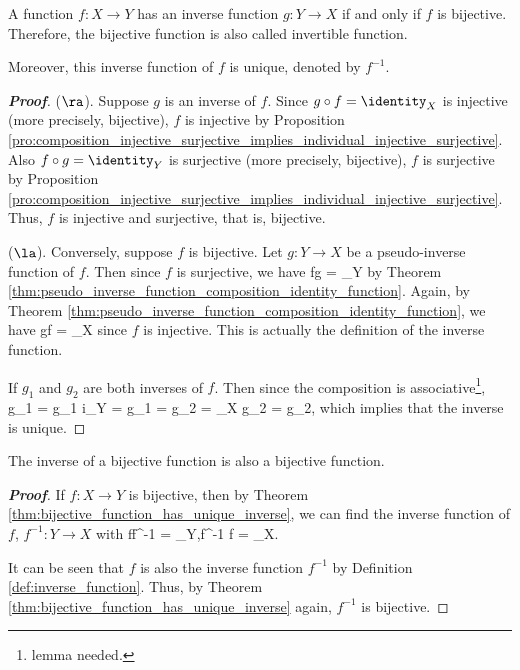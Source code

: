 \begin{theorem}\label{thm:bijective_function_has_unique_inverse}
A function $f:X\to Y$ has an inverse function $g:Y\to X$ if and only if $f$ is bijective. Therefore, the bijective function is also called invertible function.

Moreover, this inverse function of $f$ is unique, denoted by $f^{-1}$.
\end{theorem}

\begin{proof}[\bf Proof]
($\ra$). Suppose $g$ is an inverse of $f$. Since $g\circ f = \identity_X$ is injective (more precisely, bijective), $f$ is injective by Proposition \ref{pro:composition_injective_surjective_implies_individual_injective_surjective}. Also $f\circ g = \identity_Y$ is surjective (more precisely, bijective), $f$ is surjective by Proposition \ref{pro:composition_injective_surjective_implies_individual_injective_surjective}. Thus, $f$ is injective and surjective, that is, bijective.

($\la$). Conversely, suppose $f$ is bijective. Let $g:Y\to X$ be a pseudo-inverse function of $f$. Then since $f$ is surjective, we have
\be
f\circ g = \identity_Y
\ee
by Theorem \ref{thm:pseudo_inverse_function_composition_identity_function}. Again, by Theorem \ref{thm:pseudo_inverse_function_composition_identity_function}, we have
\be
g\circ f = \identity_X
\ee
since $f$ is injective. This is actually the definition of the inverse function.

If $g_1$ and $g_2$ are both inverses of $f$. Then since the composition is associative\footnote{lemma needed.},
\be
g_1 = g_1 \circ i_Y = g_1 \circ {} = \circ g_2 = \identity_X \circ g_2 = g_2,
\ee
which implies that the inverse is unique.
\end{proof}%

\begin{corollary}\label{cor:inverse_of_bijective_function_is_bijective}
The inverse of a bijective function is also a bijective function.
\end{corollary}


\begin{proof}[\bf Proof]
If $f:X\to Y$ is bijective, then by Theorem \ref{thm:bijective_function_has_unique_inverse}, we can find the inverse function of $f$, $f^{-1}:Y\to X$ with
\be
f\circ f^{-1} = \identity_Y,\qquad f^{-1} \circ f = \identity_X.
\ee

It can be seen that $f$ is also the inverse function $f^{-1}$ by Definition \ref{def:inverse_function}. Thus, by Theorem \ref{thm:bijective_function_has_unique_inverse} again, $f^{-1}$ is bijective.
\end{proof}




